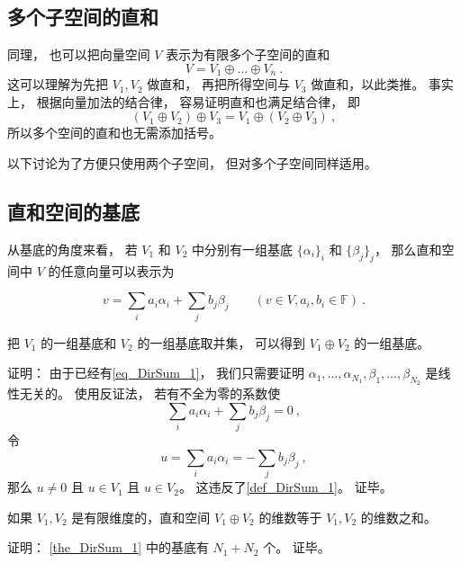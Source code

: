 \subsection{多个子空间的直和}

同理， 也可以把向量空间 $V$ 表示为有限多个子空间的直和
\begin{equation}
V = V_1 \oplus \dots \oplus V_n~.
\end{equation}
这可以理解为先把 $V_1, V_2$ 做直和， 再把所得空间与 $V_3$ 做直和，以此类推。 事实上， 根据向量加法的结合律， 容易证明直和也满足结合律， 即
\begin{equation}
(V_1 \oplus V_2) \oplus V_3 = V_1 \oplus (V_2 \oplus V_3)~,
\end{equation}
所以多个空间的直和也无需添加括号。

以下讨论为了方便只使用两个子空间， 但对多个子空间同样适用。

\subsection{直和空间的基底}

从基底的角度来看， 若 $V_1$ 和 $V_2$ 中分别有一组基底 $\{\alpha_i\}_i$ 和 $\{\beta_j\}_j$， 那么直和空间中 $V$ 的任意向量可以表示为

\begin{equation}\label{eq_DirSum_1}
{v} = \sum_i a_i {\alpha_i} + \sum_j b_j {\beta_j} \qquad (v\in V, a_i, b_i \in \mathbb F)~.
\end{equation}
\begin{theorem}{}\label{the_DirSum_1}
把 $V_1$ 的一组基底和 $V_2$ 的一组基底取并集， 可以得到 $V_1 \oplus V_2$ 的一组基底。
\end{theorem}

证明： 由于已经有\autoref{eq_DirSum_1}， 我们只需要证明 $\alpha_1, \dots, \alpha_{N_1}, \beta_1, \dots, \beta_{N_2}$ 是线性无关的。 使用反证法， 若有不全为零的系数使
\begin{equation}
\sum_i a_i {\alpha_i} + \sum_j b_j {\beta_j} = 0~,
\end{equation}
令
\begin{equation}
u = \sum_i a_i {\alpha_i} = -\sum_j b_j {\beta_j}~,
\end{equation}
那么 $u \ne 0$ 且 $u \in V_1$ 且 $u \in V_2$。 这违反了\autoref{def_DirSum_1}。 证毕。

\begin{corollary}{}\label{cor_DirSum_1}
如果 $V_1, V_2$ 是有限维度的，直和空间 $V_1 \oplus V_2$ 的维数等于 $V_1, V_2$ 的维数之和。
\end{corollary}
证明： \autoref{the_DirSum_1} 中的基底有 $N_1 + N_2$ 个。 证毕。

